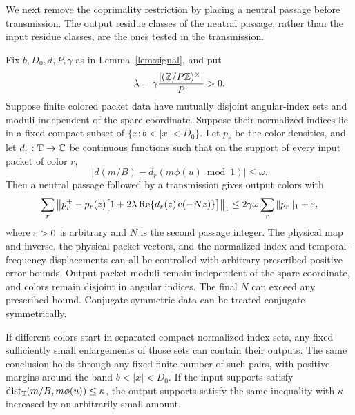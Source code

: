 We next remove the coprimality restriction by placing a neutral passage
before transmission.  The output residue classes of the neutral
passage, rather than the input residue classes, are the ones tested in
the transmission.

\begin{lemma}
\label{lem:refresh-transmit}
Fix $b,D_0,d,P,\gamma$ as in Lemma~\ref{lem:signal}, and put
\begin{equation}
 \lambda=\gamma\frac{|(\mathbb Z/P\mathbb Z)^\times|}{P}>0.
 \label{eq:signal-lambda}
\end{equation}
Suppose finite colored packet data have mutually disjoint angular-index
sets and moduli independent of the spare coordinate.  Suppose their
normalized indices lie in a fixed compact subset of
$\{x:b<|x|<D_0\}$.  Let $p_r$ be the color densities, and let
$d_r:\mathbb T\to\mathbb C$ be continuous functions such that on the support of
every input packet of color $r$,
\begin{equation}
 |d(m/B)-d_r(m\phi(u)\bmod1)|\le\omega.
 \label{eq:signal-color-match}
\end{equation}
Then a neutral passage followed by a transmission gives output colors
with
\begin{equation}
 \sum_r\left\|p_r^+
  -p_r(z)\bigl[1+2\lambda\operatorname{Re}\{d_r(z)\operatorname{e}(-Nz)\}\bigr]
                 \right\|_1
 \le 2\gamma\omega\sum_r\|p_r\|_1+\varepsilon,
 \label{eq:signal-refreshed}
\end{equation}
where $\varepsilon>0$ is arbitrary and $N$ is the second passage integer.
The physical map and inverse, the physical packet vectors, and the
normalized-index and temporal-frequency displacements can all be
controlled with arbitrary prescribed positive error bounds.  Output
packet moduli remain independent of the spare coordinate, and colors
remain disjoint in angular indices.  The final $N$ can exceed any
prescribed bound.  Conjugate-symmetric data can be treated
conjugate-symmetrically.

If different colors start in separated compact normalized-index
sets, any fixed sufficiently small enlargements of those sets can
contain their outputs.  The same conclusion holds through any fixed
finite number of such pairs, with positive margins around the band
$b<|x|<D_0$.  If the input supports satisfy
$\operatorname{dist}_\mathbb T(m/B,m\phi(u))\le\kappa$, the output supports satisfy the
same inequality with $\kappa$ increased by an arbitrarily small amount.
\end{lemma}

